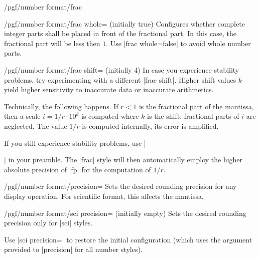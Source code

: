 \documentclass[a4paper]{ltxdoc}
\begin{document}
\begin{key}{/pgf/number format/frac}
    \begin{key}{/pgf/number format/frac whole= (initially true)}
        Configures whether complete integer parts shall be placed in front of
        the fractional part. In this case, the fractional part will be less
        then $1$. Use |frac whole=false| to avoid whole number parts.
\begin{codeexample}[width=3cm]
\hspace{1em}
\hspace{1em}
\hspace{1em}
\hspace{1em}
\hspace{1em}
\end{codeexample}
    \end{key}

    \begin{key}{/pgf/number format/frac shift= (initially 4)}
        In case you experience stability problems, try experimenting with a
        different |frac shift|. Higher shift values $k$ yield higher
        sensitivity to inaccurate data or inaccurate arithmetics.

        Technically, the following happens. If $r < 1$ is the fractional part
        of the mantissa, then a scale $i = 1/r \cdot 10^k$ is computed where
        $k$ is the shift; fractional parts of $i$ are neglected. The value
        $1/r$ is computed internally, its error is amplified.

        If you still experience stability problems, use |\usepackage{fp}| in
        your preamble. The |frac| style will then automatically employ the
        higher absolute precision of |fp| for the computation of $1/r$.
    \end{key}
\end{key}

\begin{key}{/pgf/number format/precision=}
    Sets the desired rounding precision for any display operation. For
    scientific format, this affects the mantissa.
\end{key}

\begin{key}{/pgf/number format/sci precision= (initially empty)}
    Sets the desired rounding precision only for |sci| styles.

    Use |sci precision={}| to restore the initial configuration (which uses the
    argument provided to |precision| for all number styles).
\end{key}
\end{document}

